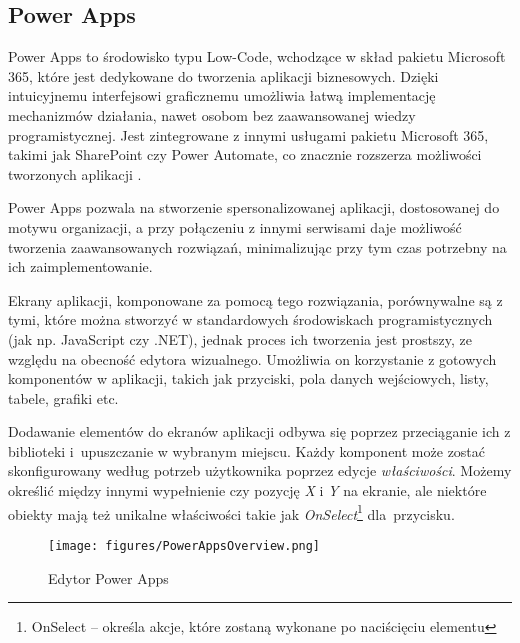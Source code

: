 \subsection{Power Apps}
Power Apps to środowisko typu Low-Code, wchodzące w skład pakietu Microsoft 365, które jest dedykowane do tworzenia aplikacji biznesowych. Dzięki intuicyjnemu interfejsowi graficznemu umożliwia łatwą implementację mechanizmów działania, nawet osobom bez zaawansowanej wiedzy programistycznej. Jest zintegrowane z innymi usługami pakietu Microsoft 365, takimi jak SharePoint czy Power Automate, co znacznie rozszerza możliwości tworzonych aplikacji \texorpdfstring{\cite{tapanm-msft_official_nodate}}{}.

Power Apps pozwala na stworzenie spersonalizowanej aplikacji, dostosowanej do motywu organizacji, a przy połączeniu z innymi serwisami daje możliwość tworzenia zaawansowanych rozwiązań, minimalizując przy tym czas potrzebny na ich zaimplementowanie.

Ekrany aplikacji, komponowane za pomocą tego rozwiązania, porównywalne są z tymi, które można stworzyć w standardowych środowiskach programistycznych (jak np. JavaScript czy .NET), jednak proces ich tworzenia jest prostszy, ze względu na obecność edytora wizualnego. Umożliwia on korzystanie z gotowych komponentów w aplikacji, takich jak przyciski, pola danych wejściowych, listy, tabele, grafiki etc.

Dodawanie elementów do ekranów aplikacji odbywa się poprzez przeciąganie ich z biblioteki i~upuszczanie w wybranym miejscu. Każdy komponent może zostać skonfigurowany według potrzeb użytkownika poprzez edycje \emph{właściwości}. Możemy określić między innymi wypełnienie czy pozycję \emph{X} i \emph{Y} na ekranie, ale niektóre obiekty mają też unikalne właściwości takie jak \emph{OnSelect}\footnote{OnSelect -- określa akcje, które zostaną wykonane po naciścięciu elementu} dla~przycisku.

\newpage

\begin{figure}[h]
    \centering
    \texttt{[image: figures/PowerAppsOverview.png]}
    \caption{Edytor \cite{lancedmicrosoft_understand_2024} Power Apps}
    \label{fig:PowerAppsEditorOverview}
\end{figure}

